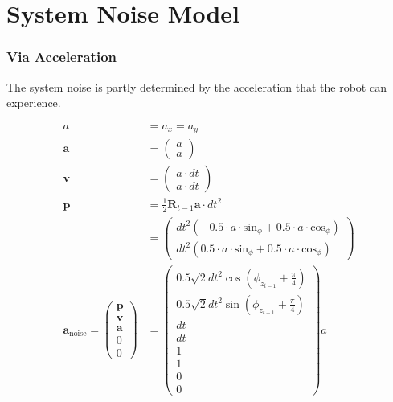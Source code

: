 \documentclass{article}
\begin{document}
\section{System Noise Model}
\subsubsection{Via Acceleration}

The system noise is partly determined by the acceleration that the robot can experience.

\begin{align}
  a &= a_x = a_y \\
  \textbf{a} &= \left(\begin{matrix}a\\a\end{matrix}\right) \\
  \textbf{v} &= \left(\begin{matrix}a \cdot dt\\a \cdot dt\end{matrix}\right) \\
  \textbf{p} &= \frac{1}{2}\textbf{R}_{t-1}\textbf{a} \cdot dt^2 \\ 
  &= \left(\begin{matrix}dt^{2} \left(- 0.5 \cdot a \cdot \textrm{sin}_\phi + 0.5 \cdot a \cdot \textrm{cos}_\phi\right)\\dt^{2} \left(0.5 \cdot a \cdot \textrm{sin}_\phi + 0.5 \cdot a \cdot \textrm{cos}_\phi\right)\end{matrix}\right) \\
  \textbf{a}_{\textrm{noise}} =
  \left(\begin{matrix}
    \textbf{p} \\
    \textbf{v} \\
    \textbf{a} \\
    0 \\
    0
  \end{matrix}\right)
&=\left(\begin{matrix}0.5 \sqrt{2} dt^{2} \cos{\left(\phi_{z_{t-1}} + \frac{\pi}{4} \right)}\\0.5 \sqrt{2} dt^{2} \sin{\left(\phi_{z_{t-1}} + \frac{\pi}{4} \right)}\\dt\\dt\\1\\1\\0\\0\end{matrix}\right) a
\end{align}
\end{document}
